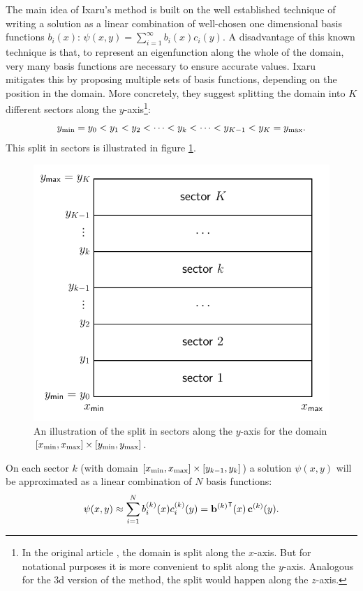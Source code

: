 The main idea of Ixaru's method is built on the well established technique \cite{titchmarsh_eigenfunction_1962} of writing a solution as a linear combination of well-chosen one dimensional basis functions $b_i(x)$: $\psi(x, y) = \sum_{i=1}^\infty b_i(x) c_i(y)$. A disadvantage of this known technique is that, to represent an eigenfunction along the whole of the domain, very many basis functions are necessary to ensure accurate values. Ixaru mitigates this by proposing multiple sets of basis functions, depending on the position in the domain. More concretely, they suggest splitting the domain into $K$ different sectors along the $y$-axis\footnote{In the original article \cite{ixaru_new_2010}, the domain is split along the $x$-axis. But for notational purposes it is more convenient to split along the $y$-axis. Analogous for the 3d version of the method, the split would happen along the $z$-axis.}:
$$
    {y_{\text{min}}} = y_0 < y_1 < y_2 < \dots < y_k < \dots < y_{K-1} < y_{K} = {y_{\text{max}}}\text{.}
$$
This split in sectors is illustrated in figure \ref{fig:c3_2dsectors}.

\begin{figure}
    \begin{center}
        \includegraphics[width=.6\textwidth]{img/chapter3/2dsectors.pdf}
        \caption{\label{fig:c3_2dsectors} An illustration of the split in sectors along the $y$-axis for the domain $[{x_{\text{min}}}, {x_{\text{max}}}]\times[{y_{\text{min}}}, {y_{\text{max}}}]$.}
    \end{center}
\end{figure}

On each sector $k$ (with domain $[{x_{\text{min}}}, {x_{\text{max}}}]\times[y_{k-1}, y_k]$) a solution $\psi(x, y)$ will be approximated as a linear combination of $N$ basis functions:
\begin{equation}\label{equ:c3_lincomb_basis}
    \psi(x, y) \approx \sum_{i=1}^{N} b_i^{(k)}(x) c_i^{(k)}(y) = {{\vb{b}^{(k)}}}^\intercal(x) \, \vb{c}^{(k)}(y) \text{.}
\end{equation}

